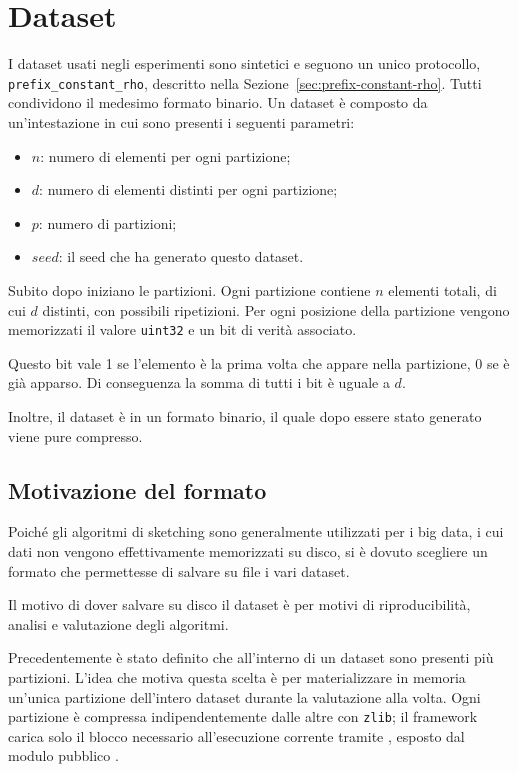 \section{Dataset}
I dataset usati negli esperimenti sono sintetici e seguono un unico protocollo,
\texttt{prefix\_constant\_rho}, descritto nella Sezione~\ref{sec:prefix-constant-rho}.
Tutti condividono il medesimo formato binario. Un dataset è composto da
un'intestazione in cui sono presenti i seguenti parametri:
\begin{itemize}
    \item $n$: numero di elementi per ogni partizione;
    \item $d$: numero di elementi distinti per ogni partizione;
    \item $p$: numero di partizioni;
    \item $seed$: il seed che ha generato questo dataset.
\end{itemize}
Subito dopo iniziano le partizioni. Ogni partizione contiene \(n\) elementi totali,
di cui \(d\) distinti, con possibili ripetizioni. Per ogni posizione della partizione
vengono memorizzati il valore \texttt{uint32} e un bit di verità associato.

Questo bit vale 1 se l'elemento è la prima volta che appare nella partizione, 0 se è già apparso. Di conseguenza la somma di tutti i bit è uguale a $d$.

Inoltre, il dataset è in un formato binario, il quale dopo essere stato generato viene pure compresso.

\subsection{Motivazione del formato}
Poiché gli algoritmi di sketching sono generalmente utilizzati per i big data, 
i cui dati non vengono effettivamente memorizzati su disco, si è dovuto
scegliere un formato che permettesse di salvare su file i vari dataset.

Il motivo di dover salvare su disco il dataset è per motivi di riproducibilità,
analisi e valutazione degli algoritmi.

Precedentemente \`e stato definito che all'interno di un dataset sono presenti più partizioni.
L'idea che motiva questa scelta è per materializzare in memoria
un'unica partizione dell'intero dataset durante la valutazione alla volta. 
Ogni partizione è compressa
indipendentemente dalle altre con \texttt{zlib}; il framework carica solo il blocco
necessario all'esecuzione corrente tramite ,
esposto dal modulo pubblico .

